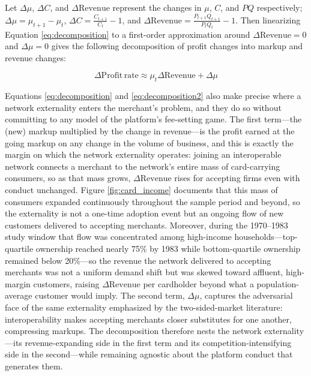 \documentclass[12pt,english]{article}
\begin{document}

Let $\Delta\mu$, $\Delta C$, and $\Delta \mathrm{Revenue}$ represent the changes in $\mu$, $C$, and $PQ$ respectively; $\Delta\mu = \mu_{t+1} - \mu_t$, $\Delta C = \frac{C_{t+1}}{C_t} - 1$, and $\Delta \mathrm{Revenue} = \frac{P_{t+1}Q_{t+1}}{P_tQ_t} - 1$. Then linearizing Equation \ref{eq:decomposition} to a first-order approximation around $\Delta \mathrm{Revenue} = 0$ and $\Delta \mu = 0$ gives the following decomposition of profit changes into markup and revenue changes: 

\begin{equation}\label{eq:decomposition2}
    \Delta \mathrm{Profit\,rate} \approx \mu_{t} \Delta \mathrm{Revenue} + \Delta \mu
\end{equation}

Equations \ref{eq:decomposition} and \ref{eq:decomposition2} also make precise where a network externality enters the merchant's problem, and they do so without committing to any model of the platform's fee-setting game. The first term---the (new) markup multiplied by the change in revenue---is the profit earned at the going markup on any change in the volume of business, and this is exactly the margin on which the network externality operates: joining an interoperable network connects a merchant to the network's entire mass of card-carrying consumers, so as that mass grows, $\Delta \mathrm{Revenue}$ rises for accepting firms even with conduct unchanged. Figure \ref{fig:card_income} documents that this mass of consumers expanded continuously throughout the sample period and beyond, so the externality is not a one-time adoption event but an ongoing flow of new customers delivered to accepting merchants. Moreover, during the 1970--1983 study window that flow was concentrated among high-income households---top-quartile ownership reached nearly 75\% by 1983 while bottom-quartile ownership remained below 20\%---so the revenue the network delivered to accepting merchants was not a uniform demand shift but was skewed toward affluent, high-margin customers, raising $\Delta \mathrm{Revenue}$ per cardholder beyond what a population-average customer would imply. The second term, $\Delta \mu$, captures the adversarial face of the same externality emphasized by the two-sided-market literature: interoperability makes accepting merchants closer substitutes for one another, compressing markups. The decomposition therefore nests the network externality---its revenue-expanding side in the first term and its competition-intensifying side in the second---while remaining agnostic about the platform conduct that generates them.
\end{document}
